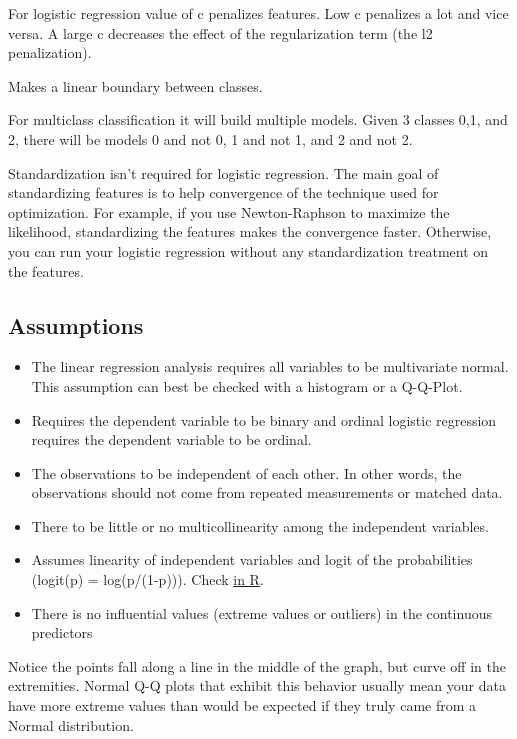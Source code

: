 \documentclass[]{book}
\begin{document}
For logistic regression value of c penalizes features. Low c penalizes a
lot and vice versa. A large c decreases the effect of the regularization
term (the l2 penalization).

Makes a linear boundary between classes.

For multiclass classification it will build multiple models. Given 3
classes 0,1, and 2, there will be models 0 and not 0, 1 and not 1, and 2
and not 2.

Standardization isn't required for logistic regression. The main goal of
standardizing features is to help convergence of the technique used for
optimization. For example, if you use Newton-Raphson to maximize the
likelihood, standardizing the features makes the convergence faster.
Otherwise, you can run your logistic regression without any
standardization treatment on the features.

\subsection{Assumptions}\label{assumptions}

\begin{itemize}
\item
  The linear regression analysis requires all variables to be
  multivariate normal. This assumption can best be checked with a
  histogram or a Q-Q-Plot.
\item
  Requires the dependent variable to be binary and ordinal logistic
  regression requires the dependent variable to be ordinal.
\item
  The observations to be independent of each other. In other words, the
  observations should not come from repeated measurements or matched
  data.
\item
  There to be little or no multicollinearity among the independent
  variables.
\item
  Assumes linearity of independent variables and logit of the
  probabilities (logit(p) = log(p/(1-p))). Check
  \href{https://stats.stackexchange.com/questions/169348/how-should-i-check-the-assumption-of-linearity-to-the-logit-for-the-continuous-i}{in
  R}.
\item
  There is no influential values (extreme values or outliers) in the
  continuous predictors
\end{itemize}

Notice the points fall along a line in the middle of the graph, but
curve off in the extremities. Normal Q-Q plots that exhibit this
behavior usually mean your data have more extreme values than would be
expected if they truly came from a Normal distribution.
\end{document}
